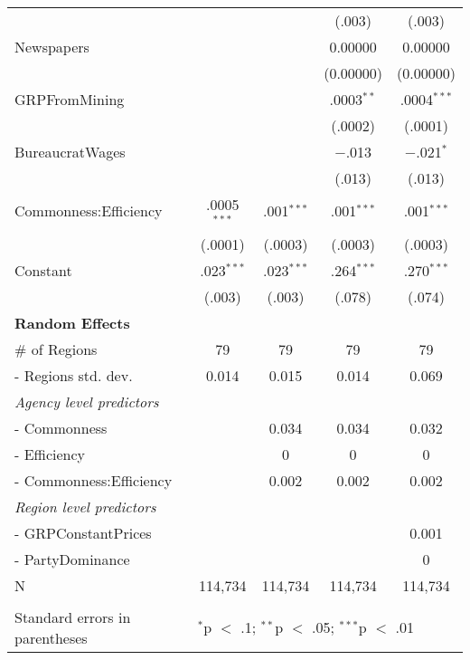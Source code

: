 \begin{table}[!htbp]
{\begin{tabular}{@{\extracolsep{5pt}}lcccc}
  &  &  & (.003) & (.003) \\ 
  Newspapers &  &  & 0.00000 & 0.00000 \\ 
  &  &  & (0.00000) & (0.00000) \\ 
  GRPFromMining &  &  & .0003$^{**}$ & .0004$^{***}$ \\ 
  &  &  & (.0002) & (.0001) \\ 
  BureaucratWages &  &  & $-$.013 & $-$.021$^{*}$ \\ 
  &  &  & (.013) & (.013) \\ 
  Commonness:Efficiency & .0005$^{***}$ & .001$^{***}$ & .001$^{***}$ & .001$^{***}$ \\ 
  & (.0001) & (.0003) & (.0003) & (.0003) \\ 
  Constant & .023$^{***}$ & .023$^{***}$ & .264$^{***}$ & .270$^{***}$ \\ 
  & (.003) & (.003) & (.078) & (.074) \\ 
\hline
{\bf Random Effects} & & \\
\hline
\# of Regions &  79 & 79 & 79 & 79 \\
- Regions std. dev. &  0.014 & 0.015 & 0.014 & 0.069 \\
{\it Agency level predictors} & & \\
-  Commonness & & 0.034 & 0.034 & 0.032 \\
-  Efficiency & & 0 & 0 & 0 \\
-  Commonness:Efficiency & & 0.002 & 0.002 & 0.002 \\
{\it Region level predictors} & & \\
-  GRPConstantPrices & & & & 0.001 \\
-  PartyDominance & & & & 0 \\
 N & 114,734 & 114,734 & 114,734 & 114,734 \\ 
\hline \\[-1.8ex] 
Standard errors in parentheses & \multicolumn{4}{l}{$^{*}$p $<$ .1; $^{**}$p $<$ .05; $^{***}$p $<$ .01} \\ 
\end{tabular} 
} %
\end{table} 
